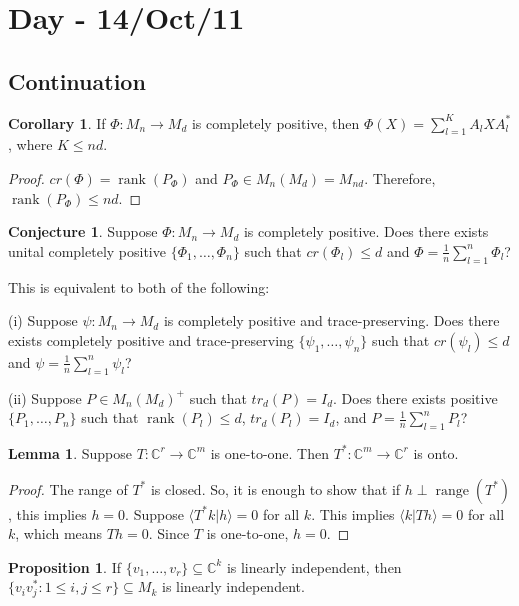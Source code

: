 \documentclass[12pt]{article}
\theoremstyle{definition}
\newtheorem*{lemma}{Lemma}
\newtheorem*{corollary}{Corollary}
\newtheorem*{proposition}{Proposition}
\newtheorem*{conjecture}{Conjecture}
\newcommand{\C}{\mathbb{C}}
\begin{document}
\section{Day - 14/Oct/11}

\subsection{Continuation}

\begin{corollary}
If $\Phi:M_n \to M_d$ is completely positive, then $\Phi(X)=\sum_{l=1}^K A_lXA_l^*$, where $K \leq nd$.
\end{corollary}

\begin{proof}
$cr(\Phi)=\operatorname{rank}(P_\Phi)$ and $P_\Phi \in M_n(M_d)=M_{nd}$. Therefore, $\operatorname{rank}(P_\Phi) \leq nd$.
\end{proof}

\begin{conjecture}
Suppose $\Phi:M_n \to M_d$ is completely positive. Does there exists unital completely positive $\{\Phi_1,\ldots,\Phi_n\}$ such that $cr(\Phi_l) \leq d$ and $\Phi = \frac{1}{n}\sum_{l=1}^n \Phi_l$?

This is equivalent to both of the following:

(i) Suppose $\psi:M_n \to M_d$ is completely positive and trace-preserving. Does there exists completely positive and trace-preserving $\{\psi_1,\ldots,\psi_n\}$ such that $cr(\psi_l) \leq d$ and $\psi = \frac{1}{n}\sum_{l=1}^n \psi_l$?

(ii) Suppose $P \in M_n(M_d)^+$ such that $tr_d(P)=I_d$. Does there exists positive $\{P_1,\ldots,P_n\}$ such that $\operatorname{rank}(P_l) \leq d$, $tr_d(P_l)=I_d$, and $P = \frac{1}{n}\sum_{l=1}^n P_l$?
\end{conjecture}


\begin{lemma}
Suppose $T : \C^r \to \C^m$ is one-to-one. Then $T^* : \C^m \to \C^r$ is onto.
\end{lemma}

\begin{proof}
The range of $T^*$ is closed. So, it is enough to show that if $h \perp \operatorname{range}(T^*)$, this implies $h=0$. Suppose $\langle T^*k|h\rangle = 0$ for all $k$. This implies $\langle k|Th\rangle = 0$ for all $k$, which means $Th=0$. Since $T$ is one-to-one, $h=0$.
\end{proof}

\begin{proposition}
If $\{v_1,\ldots,v_r\} \subseteq \C^k$ is linearly independent, then $\{v_iv_j^* : 1 \leq i,j \leq r\} \subseteq M_k$ is linearly independent.
\end{proposition}
\end{document}
